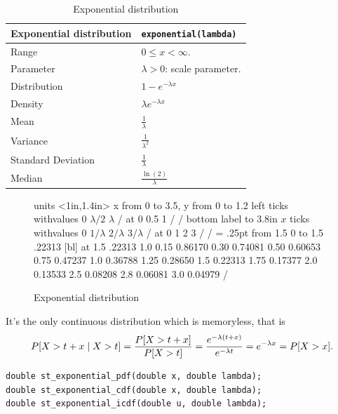 \begin{table}[htb]
\begin{tabularx}{\textwidth}{ll}
Exponential distribution & \verb|exponential(lambda)| \\
\hline
Range & $0 \leq x < \infty$.\\
Parameter & $\lambda > 0$: scale parameter. \\
Distribution &  $1 - e^{-\lambda x}$ \\
Density & $\lambda e^{-\lambda x}$ \\
Mean & $\frac{1}{\lambda}$ \\
Variance & $\frac{1}{\lambda^2}$ \\
Standard Deviation & $\frac{1}{\lambda}$ \\
Median & $\frac{\ln(2)}{\lambda}$ \\
\hline
\end{tabularx}
\label{tab:exponential}
\caption{Exponential distribution}
\end{table}

\begin{figure}
\begin{center}
\beginpicture
\setcoordinatesystem units <1in,1.4in>
\setplotarea x from 0 to 3.5, y from 0 to 1.2
\axis left 
  ticks withvalues 0 $\lambda/2$ $\lambda$ / at 0 0.5 1 / /
\axis bottom
  label {\hbox to 3.8in {\hfill $x$}}
  ticks withvalues $0$ $1/\lambda$ $2/\lambda$ $3/\lambda$ / 
    at 0 1 2 3 / /
\linethickness = .25pt
\putrule from 1.5 0 to 1.5 .22313
 [bl] at 1.5 .22313
\setquadratic
{}  1.0
  0.15   0.86170  0.30   0.74081 
  0.50   0.60653  0.75   0.47237 
  1.0    0.36788  1.25   0.28650 
  1.5    0.22313  1.75   0.17377
  2.0    0.13533  2.5    0.08208
  2.8    0.06081  3.0    0.04979 /
\endpicture
\end{center}
\caption{Exponential distribution}
\label{fig:exponential}
\end{figure}

It's the only continuous distribution which is memoryless, that is
\[
 P[X > t + x \mid X > t]
    = {P[X > t+x]\over P[X > t]} 
    = {e^{-\lambda(t+x)}\over e^{-\lambda t}} 
    = e^{-\lambda x} = P[X > x].
\]

\begin{verbatim}
double st_exponential_pdf(double x, double lambda);
double st_exponential_cdf(double x, double lambda);
double st_exponential_icdf(double u, double lambda);
\end{verbatim}

